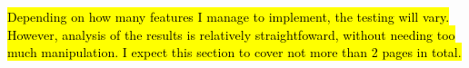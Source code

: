 \documentclass[main.tex]{subfiles}
\begin{document}
\hl{Depending on how many features I manage to implement, the testing will vary. However, analysis of the results is relatively straightfoward, without needing too much manipulation. I expect this section to cover not more than 2 pages in total. }
\end{document}
